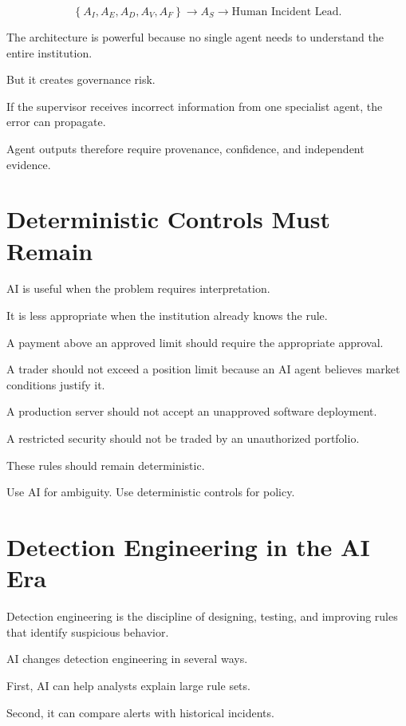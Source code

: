 \begin{equation}
\left\{
A_I,
A_E,
A_D,
A_V,
A_F
\right\}
\rightarrow
A_S
\rightarrow
\text{Human Incident Lead}.
\end{equation}

The architecture is powerful because no single agent needs to understand the entire institution.

But it creates governance risk.

If the supervisor receives incorrect information from one specialist agent, the error can propagate.

Agent outputs therefore require provenance, confidence, and independent evidence.

\section{Deterministic Controls Must Remain}

AI is useful when the problem requires interpretation.

It is less appropriate when the institution already knows the rule.

A payment above an approved limit should require the appropriate approval.

A trader should not exceed a position limit because an AI agent believes market conditions justify it.

A production server should not accept an unapproved software deployment.

A restricted security should not be traded by an unauthorized portfolio.

These rules should remain deterministic.

\begin{intuition}
Use AI for ambiguity. Use deterministic controls for policy.
\end{intuition}

\section{Detection Engineering in the AI Era}

Detection engineering is the discipline of designing, testing, and improving rules that identify suspicious behavior.

AI changes detection engineering in several ways.

First, AI can help analysts explain large rule sets.

Second, it can compare alerts with historical incidents.

